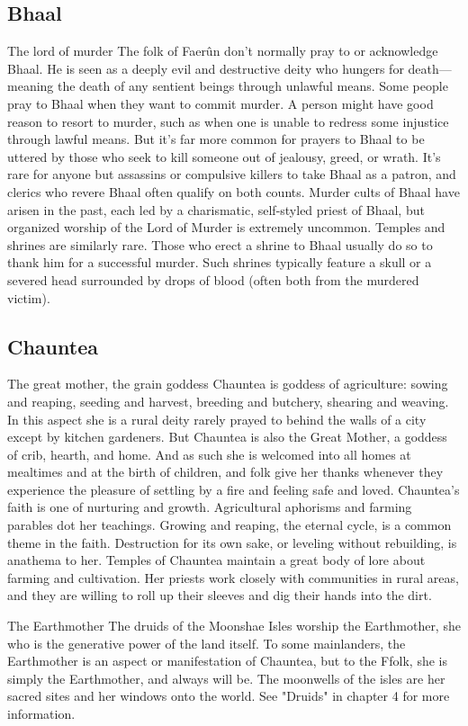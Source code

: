 \documentclass[10pt,a4paper,twoside,twocolumn,openany,bg=print,nodeprecatedcode]{dndbook}
\begin{document}
\subsection{Bhaal}
The lord of murder
The folk of Faerûn don't normally pray to or acknowledge Bhaal. He is seen as a deeply evil and destructive deity who hungers for death—meaning the death of any sentient beings through unlawful means.
Some people pray to Bhaal when they want to commit murder. A person might have good reason to resort to murder, such as when one is unable to redress some injustice through lawful means. But it's far more common for prayers to Bhaal to be uttered by those who seek to kill someone out of jealousy, greed, or wrath. It's rare for anyone but assassins or compulsive killers to take Bhaal as a patron, and clerics who revere Bhaal often qualify on both counts.
Murder cults of Bhaal have arisen in the past, each led by a charismatic, self-styled priest of Bhaal, but organized worship of the Lord of Murder is extremely uncommon. Temples and shrines are similarly rare. Those who erect a shrine to Bhaal usually do so to thank him for a successful murder. Such shrines typically feature a skull or a severed head surrounded by drops of blood (often both from the murdered victim).
\subsection{Chauntea}
The great mother, the grain goddess
Chauntea is goddess of agriculture: sowing and reaping, seeding and harvest, breeding and butchery, shearing and weaving. In this aspect she is a rural deity rarely prayed to behind the walls of a city except by kitchen gardeners. But Chauntea is also the Great Mother, a goddess of crib, hearth, and home. And as such she is welcomed into all homes at mealtimes and at the birth of children, and folk give her thanks whenever they experience the pleasure of settling by a fire and feeling safe and loved.
Chauntea's faith is one of nurturing and growth. Agricultural aphorisms and farming parables dot her teachings. Growing and reaping, the eternal cycle, is a common theme in the faith. Destruction for its own sake, or leveling without rebuilding, is anathema to her.
Temples of Chauntea maintain a great body of lore about farming and cultivation. Her priests work closely with communities in rural areas, and they are willing to roll up their sleeves and dig their hands into the dirt.
\begin{DndComment}{The Earthmother}
The druids of the Moonshae Isles worship the Earthmother, she who is the generative power of the land itself. To some mainlanders, the Earthmother is an aspect or manifestation of Chauntea, but to the Ffolk, she is simply the Earthmother, and always will be. The moonwells of the isles are her sacred sites and her windows onto the world. See "Druids" in chapter 4 for more information.
\end{DndComment}
\end{document}
